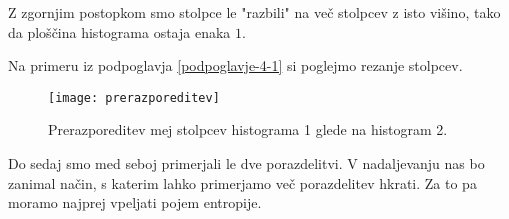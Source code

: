 Z zgornjim postopkom smo stolpce le "razbili" na več stolpcev z isto višino, tako da ploščina histograma ostaja enaka $1$.

\begin{zgled}
Na primeru iz podpoglavja \ref{podpoglavje-4-1} si poglejmo rezanje stolpcev.
\begin{figure}[h!]
	\centering
	\texttt{[image: prerazporeditev]}
	\caption{Prerazporeditev mej stolpcev histograma 1 glede na histogram 2.}
    \end{figure}
    
\end{zgled}

Do sedaj smo med seboj primerjali le dve porazdelitvi. V nadaljevanju nas bo zanimal način, s katerim lahko primerjamo več porazdelitev hkrati. Za to pa moramo najprej vpeljati pojem entropije.